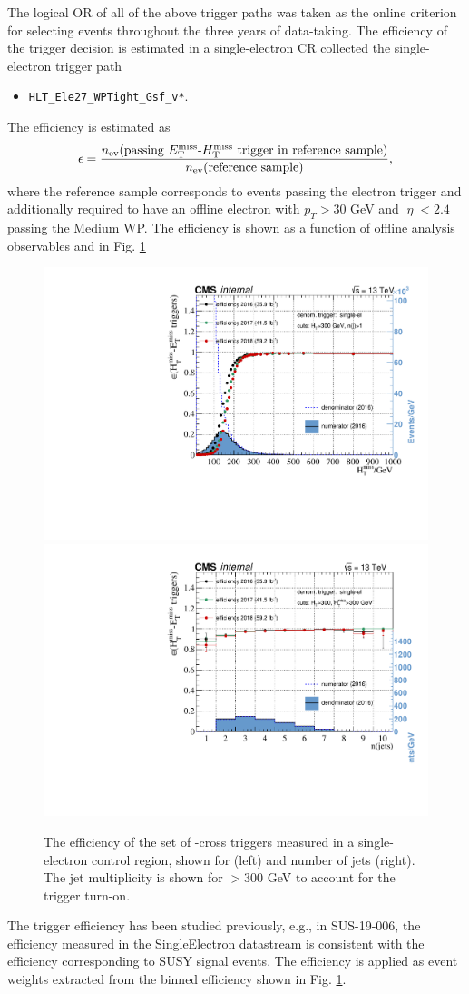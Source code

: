 The logical OR of all of the above trigger paths was taken as the
online criterion for selecting events throughout the three years of
data-taking.  The efficiency of the trigger decision is estimated in a single-electron CR collected the single-electron trigger path
\begin{itemize}
\item \texttt{HLT\_Ele27\_WPTight\_Gsf\_v*}.
\end{itemize}
The efficiency is estimated as
\begin{equation}
\epsilon = \frac{ n_{\text{ev}}(\text{passing \MET-\mht trigger in reference sample}) }{n_{\text{ev}}(\text{reference sample})},
\end{equation}
where the reference sample corresponds to events passing the electron trigger and additionally required to have an offline electron with $p_{T}>30$ GeV and $|\eta|<2.4$ passing the Medium WP. The efficiency is shown as a function of offline analysis observables \mht and \njets in Fig. \ref{fig:main-trigger-real-met} 

\begin{figure}[]
\centering
\includegraphics[width=0.48\linewidth]{plots/trigger/TrigEffMht.pdf}
\includegraphics[width=0.48\linewidth]{plots/trigger/TrigEffNJets.pdf}
\caption{The efficiency of the set of \MET-\mht cross
  triggers measured in a single-electron control region, shown for \mht (left) and number of jets (right). The jet multiplicity is shown for \mht$>300$ GeV to account for the trigger turn-on.
  }
\label{fig:main-trigger-real-met}
\end{figure}

The trigger efficiency has been studied previously, e.g., in SUS-19-006, the efficiency measured in the SingleElectron datastream is consistent with the efficiency corresponding to SUSY signal events. The efficiency is applied as event weights extracted from the binned efficiency shown in Fig. \ref{fig:main-trigger-real-met}.



